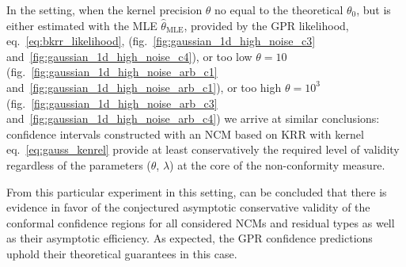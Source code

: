 \documentclass[a4paper,14pt]{extarticle}
\begin{document}
In the setting, when the kernel precision $\theta$ no equal to the theoretical $\theta_0$,
but is either estimated with the MLE $\hat{\theta}_\text{MLE}$, provided by the GPR
likelihood, eq.~\ref{eq:bkrr_likelihood}, (fig.~\ref{fig:gaussian_1d_high_noise_c3}
and~\ref{fig:gaussian_1d_high_noise_c4}), or too low $\theta=10$ (fig.~\ref{fig:gaussian_1d_high_noise_arb_c1}
and~\ref{fig:gaussian_1d_high_noise_arb_c1}), or too high $\theta=10^3$ (fig.~\ref{fig:gaussian_1d_high_noise_arb_c3}
and~\ref{fig:gaussian_1d_high_noise_arb_c4}) we arrive at similar conclusions: confidence
intervals constructed with an NCM based on KRR with kernel eq.~\ref{eq:gauss_kenrel}
provide at least conservatively the required level of validity regardless of the
parameters ($\theta$, $\lambda$) at the core of the non-conformity measure.

From this particular experiment in this setting, can be concluded that there is evidence
in favor of the conjectured asymptotic conservative validity of the conformal confidence
regions for all considered NCMs and residual types as well as their asymptotic efficiency.
As expected, the GPR confidence predictions uphold their theoretical guarantees in
this case.
\end{document}

